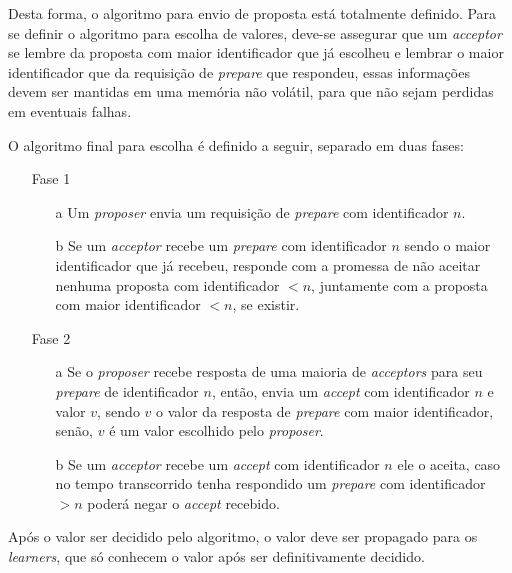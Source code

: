 \documentclass[12pt,
openright, 
oneside,
a4paper,
brazil]{facom-ufu-abntex2}
\theoremstyle{definition}
\begin{document}
Desta forma, o algoritmo para envio de proposta está totalmente definido. Para se definir
o algoritmo para escolha de valores, deve-se assegurar que um \textit{acceptor} se
lembre da proposta com maior identificador que já escolheu e lembrar o maior identificador
que da requisição de \textit{prepare} que respondeu, essas informações devem ser mantidas
em uma memória não volátil, para que não sejam perdidas em eventuais falhas.

O algoritmo final para escolha é definido a seguir, separado em duas fases:

\begin{itemize}
    \item [Fase 1]
    \begin{itemize}
        \item [a] Um \textit{proposer} envia um requisição de \textit{prepare} com
        identificador $n$.
        
        \item [b] Se um \textit{acceptor} recebe um \textit{prepare} com identificador
        $n$ sendo o maior identificador que já recebeu, responde com a promessa de não
        aceitar nenhuma proposta com identificador $<n$, juntamente com a proposta com
        maior identificador $<n$, se existir.
    \end{itemize}
    
    \item [Fase 2]
    \begin{itemize}
        \item [a] Se o \textit{proposer} recebe resposta de uma maioria de \textit{acceptors}
        para seu \textit{prepare} de identificador $n$, então, envia um \textit{accept} 
        com identificador $n$ e valor $v$, sendo $v$ o valor da resposta de \textit{prepare}
        com maior identificador, senão, $v$ é um valor escolhido pelo \textit{proposer}.
        
        \item [b] Se um \textit{acceptor} recebe um \textit{accept} com identificador $n$
        ele o aceita, caso no tempo transcorrido tenha respondido um \textit{prepare}
        com identificador $>n$ poderá negar o \textit{accept} recebido.
    \end{itemize}
\end{itemize}

Após o valor ser decidido pelo algoritmo, o valor deve ser propagado para os \textit{learners},
que só conhecem o valor após ser definitivamente decidido.
\end{document}
